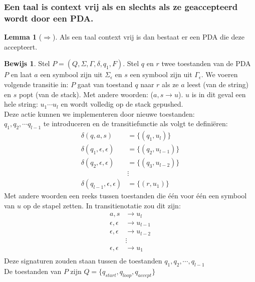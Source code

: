 \documentclass[12pt,a4paper]{article}
\theoremstyle{definition}
\newtheorem{bewijs}{Bewijs}[section]
\newtheorem{lemma}{Lemma}[section]
\newcommand{\ra}{\ensuremath{\rightarrow}}
\begin{document}
\subsubsection{Een taal is context vrij als en slechts als ze geaccepteerd wordt door een PDA.}
	\begin{lemma}[$\Rightarrow$]
		Als een taal context vrij is dan bestaat er een PDA die deze accepteert.
		
		\begin{bewijs}
			Stel $P = (Q,\Sigma,\Gamma,\delta,q_1,F)$. Stel $q$ en $r$ twee toestanden van de PDA $P$ en laat $a$ een symbool zijn uit $\Sigma_\epsilon$ en $s$ een symbool zijn uit $\Gamma_\epsilon$. We voeren volgende transitie in: $P$ gaat van toestand $q$ naar $r$ als ze $a$ leest (van de string) en $s$ popt (van de stack). Met andere woorden: ($a,s\ra u$). $u$ is in dit geval een hele string: $u_1 \cdots u_l$ en wordt volledig op de stack gepushed.\\
			Deze actie kunnen we implementeren door nieuwe toestanden: 
			\\$q_1, q_2, \cdots q_{l-1}$ te introduceren en de transitiefunctie als volgt te definiëren: \begin{align*}
			\delta(q,a,s) &= \{(q_1,u_l)\}\\
			\delta(q_1,\epsilon,\epsilon) &= \{(q_2,u_{l-1})\}\\
			\delta(q_2,\epsilon,\epsilon) &= \{(q_3,u_{l-2})\}\\
			&\vdots\\
			\delta(q_{l-1},\epsilon,\epsilon) &= \{(r,u_1)\}
			\end{align*}
			Met andere woorden een reeks tussen toestanden die één voor één een symbool van $u$ op de stapel zetten. In transitienotatie zou dit zijn: 
			\begin{align*}
			a,s&\ra u_l\\
			\epsilon,\epsilon &\ra u_{l-1}\\
			\epsilon,\epsilon &\ra u_{l-2}\\
			&\vdots\\
			\epsilon,\epsilon &\ra u_{1}\\
			\end{align*}
			Deze signaturen zouden staan tussen de toestanden $q_1,q_2,\cdots,q_{l-1}$\\
			
			De toestanden van $P$ zijn $Q=\{q_{start},q_{loop}, q_{accept}\}$
			
		\end{bewijs}
	\end{lemma}
\end{document}
